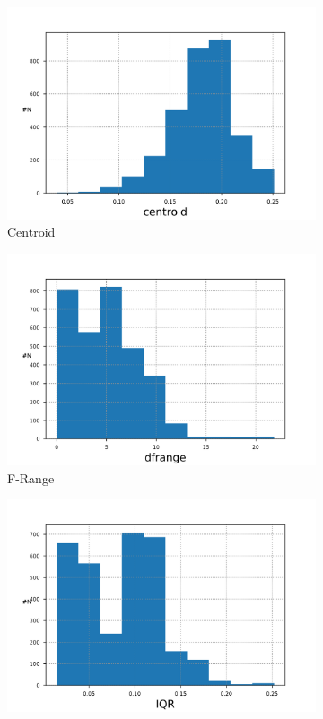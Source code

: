\documentclass{article}
\begin{document}
        \begin{figure}[H]
            \begin{subfigure}{.5\textwidth}
                \centering
                \includegraphics[width=.8\linewidth]{img1/data_histcentroid.png}
                \caption{Centroid}
            \end{subfigure}%
            \begin{subfigure}{.5\textwidth}
                \centering
                \includegraphics[width=.8\linewidth]{img1/data_histdfrange.png}
                \caption{F-Range}
            \end{subfigure}
            \begin{subfigure}{.5\textwidth}
                \centering
                \includegraphics[width=.8\linewidth]{img1/data_histIQR.png}

\end{subfigure}
\end{figure}
\end{document}
